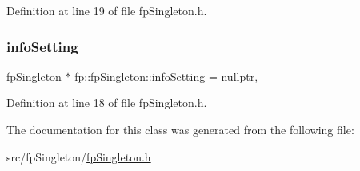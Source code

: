 Definition at line 19 of file fp\+Singleton.\+h.

\mbox{\label{classfp_1_1fpSingleton_a0e2c02e7e7f730f59e5c1f10005d581c}} 
\subsubsection{\texorpdfstring{info\+Setting}{infoSetting}}
{\footnotesize\ttfamily \hyperlink{classfp_1_1fpSingleton}{fp\+Singleton} $\ast$ fp\+::fp\+Singleton\+::info\+Setting = nullptr\hspace{0.3cm}{\ttfamily [static]}, {\ttfamily [private]}}



Definition at line 18 of file fp\+Singleton.\+h.



The documentation for this class was generated from the following file\+:\begin{DoxyCompactItemize}
\item 
src/fp\+Singleton/\hyperlink{fpSingleton_8h}{fp\+Singleton.\+h}\end{DoxyCompactItemize}
